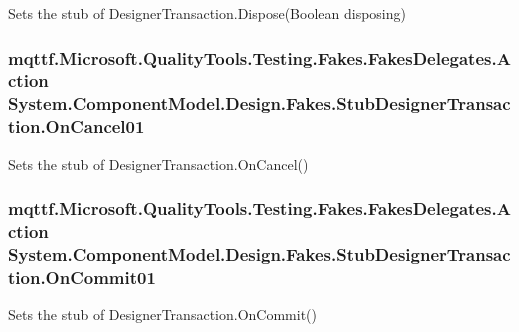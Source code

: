Sets the stub of Designer\-Transaction.\-Dispose(\-Boolean disposing)

\hypertarget{class_system_1_1_component_model_1_1_design_1_1_fakes_1_1_stub_designer_transaction_ab1daaddd59e5e735c615ad9fac0c1bc9}{
\subsubsection[{On\-Cancel01}]{\setlength{\rightskip}{0pt plus 5cm}mqttf.\-Microsoft.\-Quality\-Tools.\-Testing.\-Fakes.\-Fakes\-Delegates.\-Action System.\-Component\-Model.\-Design.\-Fakes.\-Stub\-Designer\-Transaction.\-On\-Cancel01}}\label{class_system_1_1_component_model_1_1_design_1_1_fakes_1_1_stub_designer_transaction_ab1daaddd59e5e735c615ad9fac0c1bc9}


Sets the stub of Designer\-Transaction.\-On\-Cancel()

\hypertarget{class_system_1_1_component_model_1_1_design_1_1_fakes_1_1_stub_designer_transaction_a97bd0f10951aabbc7281b86a26c06b85}{
\subsubsection[{On\-Commit01}]{\setlength{\rightskip}{0pt plus 5cm}mqttf.\-Microsoft.\-Quality\-Tools.\-Testing.\-Fakes.\-Fakes\-Delegates.\-Action System.\-Component\-Model.\-Design.\-Fakes.\-Stub\-Designer\-Transaction.\-On\-Commit01}}\label{class_system_1_1_component_model_1_1_design_1_1_fakes_1_1_stub_designer_transaction_a97bd0f10951aabbc7281b86a26c06b85}


Sets the stub of Designer\-Transaction.\-On\-Commit()



